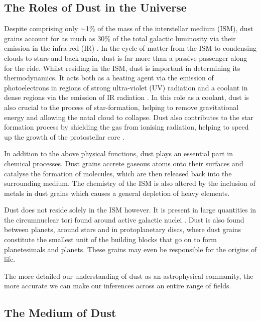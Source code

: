 \subsection{The Roles of Dust in the Universe}

Despite comprising only $\sim$1\% of the mass of the interstellar medium (ISM), dust grains account for as much as 30\% of the total galactic luminosity via their emission in the infra-red (IR) \citep{Li2003}.  In the cycle of matter from the ISM to condensing clouds to stars and back again, dust is far more than a passive passenger along for the ride.  Whilst residing in the ISM, dust is important in determining its thermodynamics.  It acts both as a heating agent via the emission of photoelectrons in regions of strong ultra-violet (UV) radiation and a coolant in dense regions via the emission of IR radiation \citep{Tielens2005}.  In this role as a coolant, dust is also crucial to the process of star-formation, helping to remove gravitational energy and allowing the natal cloud to collapse.  Dust also contributes to the star formation process by shielding the gas from ionising radiation, helping to speed up the growth of the protostellar core \citep{Draine2011}. 

In addition to the above physical functions, dust plays an essential part in chemical processes.  Dust grains  accrete gaseous atoms onto their surfaces and catalyse the formation of molecules, which are then released back into the surrounding medium.  The chemistry of the ISM is also altered by the inclusion of metals in dust grains which causes a general depletion of heavy elements.

Dust does not reside solely in the ISM however.  It is present in  large quantities in the circumnuclear tori found around active galactic nuclei \citep{Jaffe2004}.  Dust is also found between planets, around stars and in protoplanetary discs, where dust grains constitute the smallest unit of the building blocks that  go on to form planetesimals and planets.  These grains may even be responsible for the origins of life.  

The more detailed our understanding of dust as an astrophysical community, the more accurate we can make our inferences across an entire range of  fields.  


\subsection{The Medium of Dust}
\label{scn:dust_med}


